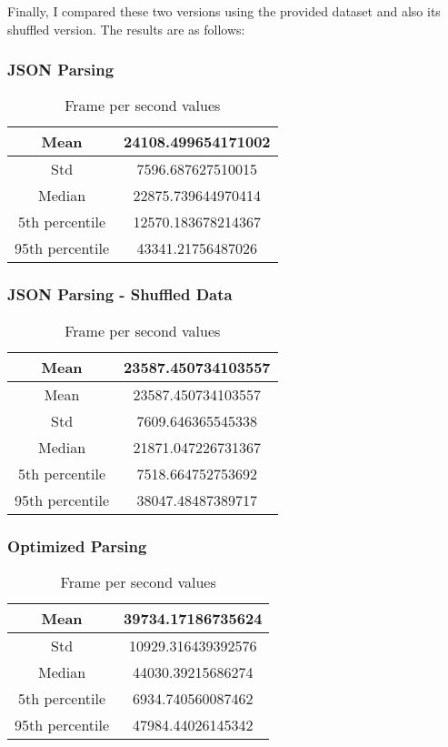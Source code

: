 \documentclass[letterpaper]{article}
\begin{document}
Finally, I compared these two versions using the provided dataset and also its shuffled version.
The results are as follows:

\subsubsection{JSON Parsing}

\begin{table}[ht]
\begin{tabular}{|c|c|}
    \hline
    Mean            & 24108.499654171002 \\
    \hline
    Std             & 7596.687627510015 \\
    \hline
    Median          & 22875.739644970414 \\
    \hline
    5th percentile  & 12570.183678214367 \\
    \hline
    95th percentile & 43341.21756487026 \\
    \hline
\end{tabular}
\caption{Frame per second values}
\end{table}

\subsubsection{JSON Parsing - Shuffled Data}

\begin{table}[ht]
\begin{tabular}{|c|c|}
    \hline
    Mean            & 23587.450734103557 \\
    \hline
    Mean            & 23587.450734103557 \\
    \hline
    Std             & 7609.646365545338 \\
    \hline
    Median          & 21871.047226731367 \\
    \hline
    5th percentile  & 7518.664752753692 \\
    \hline
    95th percentile & 38047.48487389717 \\
    \hline
\end{tabular}
\caption{Frame per second values}
\end{table}

\subsubsection{Optimized Parsing}

\begin{table}[ht]
\begin{tabular}{|c|c|}
    \hline
    Mean            & 39734.17186735624 \\
    \hline
    Std             & 10929.316439392576 \\
    \hline
    Median          & 44030.39215686274 \\
    \hline
    5th percentile  & 6934.740560087462 \\
    \hline
    95th percentile & 47984.44026145342 \\
    \hline
\end{tabular}
\caption{Frame per second values}
\end{table}
\end{document}
